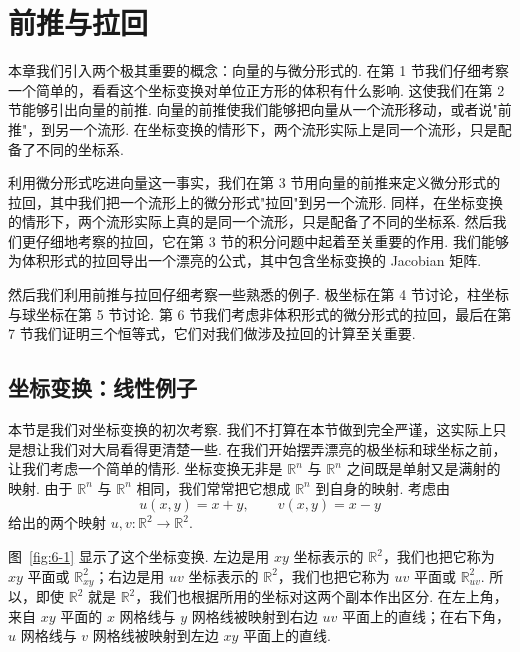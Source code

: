 \chapter{前推与拉回}

本章我们引入两个极其重要的概念：向量的与微分形式的. 在第 1 节我们仔细考察一个简单的，看看这个坐标变换对单位正方形的体积有什么影响. 这使我们在第 2 节能够引出向量的前推. 向量的前推使我们能够把向量从一个流形移动，或者说"前推"，到另一个流形. 在坐标变换的情形下，两个流形实际上是同一个流形，只是配备了不同的坐标系.

利用微分形式吃进向量这一事实，我们在第 3 节用向量的前推来定义微分形式的拉回，其中我们把一个流形上的微分形式"拉回"到另一个流形. 同样，在坐标变换的情形下，两个流形实际上真的是同一个流形，只是配备了不同的坐标系. 然后我们更仔细地考察的拉回，它在第 3 节的积分问题中起着至关重要的作用. 我们能够为体积形式的拉回导出一个漂亮的公式，其中包含坐标变换的 Jacobian 矩阵.

然后我们利用前推与拉回仔细考察一些熟悉的例子. 极坐标在第 4 节讨论，柱坐标与球坐标在第 5 节讨论. 第 6 节我们考虑非体积形式的微分形式的拉回，最后在第 7 节我们证明三个恒等式，它们对我们做涉及拉回的计算至关重要.

\section{坐标变换：线性例子}

本节是我们对坐标变换的初次考察. 我们不打算在本节做到完全严谨，这实际上只是想让我们对大局看得更清楚一些. 在我们开始摆弄漂亮的极坐标和球坐标之前，让我们考虑一个简单的情形. 坐标变换无非是 $\mathbb{R}^n$ 与 $\mathbb{R}^n$ 之间既是单射又是满射的映射. 由于 $\mathbb{R}^n$ 与 $\mathbb{R}^n$ 相同，我们常常把它想成 $\mathbb{R}^n$ 到自身的映射. 考虑由
\[
u(x,y)=x+y,\qquad v(x,y)=x-y
\]
给出的两个映射 $u,v:\mathbb{R}^2\to\mathbb{R}^2$.

图~\ref{fig:6-1} 显示了这个坐标变换. 左边是用 $xy$ 坐标表示的 $\mathbb{R}^2$，我们也把它称为 $xy$ 平面或 $\mathbb{R}^2_{xy}$；右边是用 $uv$ 坐标表示的 $\mathbb{R}^2$，我们也把它称为 $uv$ 平面或 $\mathbb{R}^2_{uv}$. 所以，即使 $\mathbb{R}^2$ 就是 $\mathbb{R}^2$，我们也根据所用的坐标对这两个副本作出区分. 在左上角，来自 $xy$ 平面的 $x$ 网格线与 $y$ 网格线被映射到右边 $uv$ 平面上的直线；在右下角，$u$ 网格线与 $v$ 网格线被映射到左边 $xy$ 平面上的直线.

